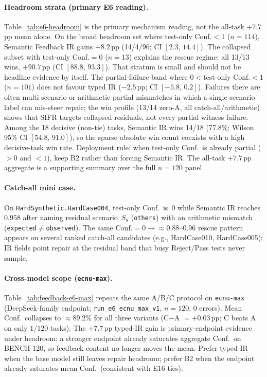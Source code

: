 \paragraph{Headroom strata (primary E6 reading).}
Table~\ref{tab:e6-headroom} is the primary mechanism reading, not the
all-task ${+}7.7$\,pp mean alone.
On the broad headroom set where test-only Conf.${<}1$ ($n{=}114$), Semantic
Feedback IR gains ${+}8.2$\,pp (14/4/96; CI $[2.3,\,14.4]$).
The collapsed subset with test-only Conf.${=}0$ ($n{=}13$) explains the
rescue regime: all 13/13 wins, ${+}90.7$\,pp (CI $[88.8,\,93.3]$).
That stratum is small and should not be headline evidence by itself.
The partial-failure band where $0{<}$test-only Conf.${<}1$ ($n{=}101$) does
not favour typed IR (${-}2.5$\,pp; CI $[-5.8,\,0.2]$).
Failures there are often multi-scenario or arithmetic partial mismatches in
which a single scenario label can mis-steer repair; the win profile
(13/14 zero-A, all catch-all/arithmetic) shows that SIFR targets collapsed
residuals, not every partial witness failure.
Among the 18 decisive (non-tie) tasks, Semantic IR wins 14/18 (77.8\%;
Wilson 95\% CI $[54.8,\,91.0]$), so the sparse absolute win count coexists
with a high decisive-task win rate.
Deployment rule: when test-only Conf.\ is already partial (${>}0$ and ${<}1$),
keep B2 rather than forcing Semantic IR.
The all-task ${+}7.7$\,pp aggregate is a supporting summary over the full
$n{=}120$ panel.

\paragraph{Catch-all mini case.}
On \texttt{HardSynthetic.HardCase004}, test-only Conf.\ is~$0$ while Semantic IR
reaches $0.958$ after naming residual scenario~$S_8$ (\texttt{others}) with an
arithmetic mismatch (\texttt{expected}$\neq$\texttt{observed}).
The same Conf.${=}0\!\to\!{\approx}0.88$--$0.96$ rescue pattern appears on several
ranked catch-all candidates (e.g., HardCase010, HardCase005); IR fields point
repair at the residual band that busy Reject/Pass tests never sample.

\paragraph{Cross-model scope (\texttt{ecnu-max}).}
Table~\ref{tab:feedback-e6-max} repeats the same A/B/C protocol on
\texttt{ecnu-max} (DeepSeek-family endpoint; \texttt{run\_e6\_ecnu\_max\_v1},
$n{=}120$, 0 errors).
Mean Conf.\ collapses to ${\approx}89.2\%$ for all three variants
(C$-$A ${=}{+}0.03$\,pp; C beats A on only $1/120$ tasks).
The +7.7\,pp typed-IR gain is primary-endpoint evidence under
headroom: a stronger endpoint already saturates aggregate Conf.\ on BENCH-120,
so feedback content no longer moves the mean.
Prefer typed IR when the base model still leaves repair headroom; prefer B2
when the endpoint already saturates mean Conf.\ (consistent with E16 ties).


